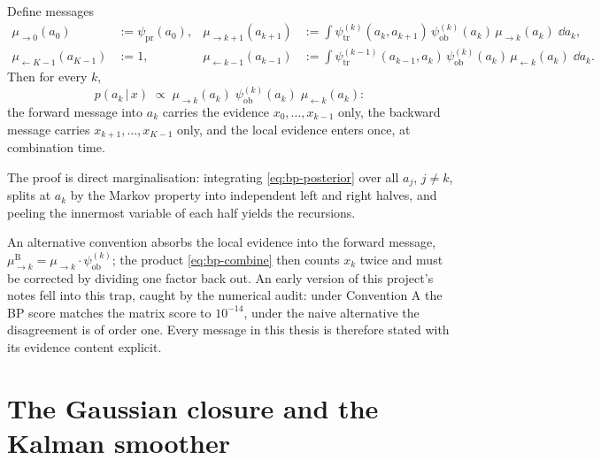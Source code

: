 \begin{proposition}\label{prop:bp-convA}
Define messages
\begin{align}
  \mu_{\to 0}(a_0) &:= \psi_{\mathrm{pr}}(a_0),
  &
  \mu_{\to k+1}(a_{k+1}) &:= \int
    \psi^{(k)}_{\mathrm{tr}}(a_k, a_{k+1})\,
    \psi^{(k)}_{\mathrm{ob}}(a_k)\,
    \mu_{\to k}(a_k)\; \dd a_k ,
  \label{eq:bp-fwd}\\
  \mu_{\leftarrow K-1}(a_{K-1}) &:= 1,
  &
  \mu_{\leftarrow k-1}(a_{k-1}) &:= \int
    \psi^{(k-1)}_{\mathrm{tr}}(a_{k-1}, a_k)\,
    \psi^{(k)}_{\mathrm{ob}}(a_k)\,
    \mu_{\leftarrow k}(a_k)\; \dd a_k .
  \label{eq:bp-bwd}
\end{align}
Then for every $k$,
\begin{equation}
  p(a_k \,|\, x) \;\propto\;
  \mu_{\to k}(a_k)\;
  \psi^{(k)}_{\mathrm{ob}}(a_k)\;
  \mu_{\leftarrow k}(a_k) :
  \label{eq:bp-combine}
\end{equation}
the forward message into $a_k$ carries the evidence
$x_0, \dots, x_{k-1}$ only, the backward message carries
$x_{k+1}, \dots, x_{K-1}$ only, and the local evidence enters once, at
combination time.
\end{proposition}

The proof is direct marginalisation: integrating \eqref{eq:bp-posterior}
over all $a_j$, $j \neq k$, splits at $a_k$ by the Markov property into
independent left and right halves, and peeling the innermost variable of
each half yields the recursions.

\begin{remark}\label{rmk:bp-trap}
An alternative convention absorbs the local evidence into the forward
message, $\mu^{\mathrm{B}}_{\to k} = \mu_{\to k} \cdot
\psi^{(k)}_{\mathrm{ob}}$; the product \eqref{eq:bp-combine} then counts
$x_k$ twice and must be corrected by dividing one factor back out. An
early version of this project's notes fell into this trap, caught by the
numerical audit: under Convention A the BP score matches the matrix score
to $10^{-14}$, under the naive alternative the disagreement is of order
one. Every message in this thesis is therefore stated with its evidence
content explicit.
\end{remark}

\section{The Gaussian closure and the Kalman smoother}
\label{sec:bp-gaussian}\label{sec:bp-kalman}

